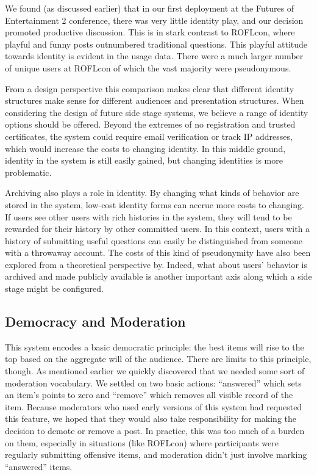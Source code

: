 We found (as discussed earlier) that in our first deployment at the Futures of Entertainment 2 conference, there was very little identity play, and our decision promoted productive discussion. This is in stark contrast to ROFLcon, where playful and funny posts outnumbered traditional questions. This playful attitude towards identity is evident in the usage data. There were a much larger number of unique users at ROFLcon of which the vast majority were pseudonymous.

From a design perspective this comparison makes clear that different identity structures make sense for different audiences and presentation structures. When considering the design of future side stage systems, we believe a range of identity options should be offered. Beyond the extremes of no registration and trusted certificates, the system could require email verification or track IP addresses, which would increase the costs to changing identity. In this middle ground, identity in the system is still easily gained, but changing identities is more problematic.

Archiving also plays a role in identity. By changing what kinds of behavior are stored in the system, low-cost identity forms can accrue more costs to changing. If users see other users with rich histories in the system, they will tend to be rewarded for their history by other committed users. \citep{Resnick:2002hf} In this context, users with a history of submitting useful questions can easily be distinguished from someone with a throwaway account. The costs of this kind of pseudonymity have also been explored from a theoretical perspective by\citep{Friedman:2001ti}. Indeed, what about users' behavior is archived and made publicly available is another important axis along which a side stage might be configured.

\subsection{Democracy and Moderation}
This system encodes a basic democratic principle: the best items will rise to the top based on the aggregate will of the audience. There are limits to this principle, though. As mentioned earlier we quickly discovered that we needed some sort of moderation vocabulary. We settled on two basic actions: ``answered'' which sets an item's points to zero and ``remove'' which removes all visible record of the item. Because moderators who used early versions of this system had requested this feature, we hoped that they would also take responsibility for making the decision to demote or remove a post. In practice, this was too much of a burden on them, especially in situations (like ROFLcon) where participants were regularly submitting offensive items, and moderation didn't just involve marking ``answered'' items. 

